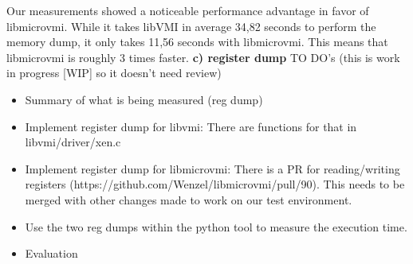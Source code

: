 \documentclass[sigconf]{acmart}
\begin{document}
\newline
\newline
Our measurements showed a noticeable performance advantage in favor of libmicrovmi. 
While it takes libVMI in average 34,82 seconds to perform the memory dump, it only takes 11,56 seconds with libmicrovmi.
This means that libmicrovmi is roughly 3 times faster.
\newline
\newline
\textbf{c) register dump}
\newline
\newline
TO DO's (this is work in progress [WIP] so it doesn't need review)
\begin{itemize}
	\item Summary of what is being measured (reg dump)
	\newline 
	\item Implement register dump for libvmi: There are functions for that in libvmi/driver/xen.c 
	\newline
	\item Implement register dump for libmicrovmi: There is a PR for reading/writing registers 
	\newline
	(https://github.com/Wenzel/libmicrovmi/pull/90). 
	\newline
	This needs to be merged with other changes made to work on our test environment.
	\newline
	\item Use the two reg dumps within the python tool to measure the execution time.
	\newline
	\item Evaluation
	\newline
	\newline
\end{itemize}
\end{document}
